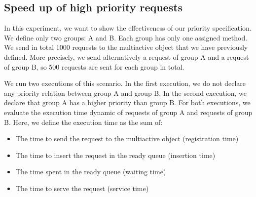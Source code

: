 \documentclass[11pt]{report}
\begin{document}
\subsection{Speed up of high priority requests}
In this experiment, we want to show the effectiveness of our priority specification. We define only two groups: A and B. Each group has only one assigned method. We send in total 1000 requests to the multiactive object that we have previously defined. More precisely, we send alternatively a request of group A and a request of group B, so 500 requests are sent for each group in total. 

We run two executions of this scenario. In the first execution, we do not declare any priority relation between group A and group B. In the second execution, we declare that group A has a higher priority than group B. For both executions, we evaluate the execution time dynamic of requests of group A and requests of group B. Here, we define the execution time as the sum of:

\begin{itemize}
\item The time to send the request to the multiactive object (registration time)
\item The time to insert the request in the ready queue (insertion time)
\item The time spent in the ready queue (waiting time)
\item The time to serve the request (service time)
\end{itemize}
\end{document}
